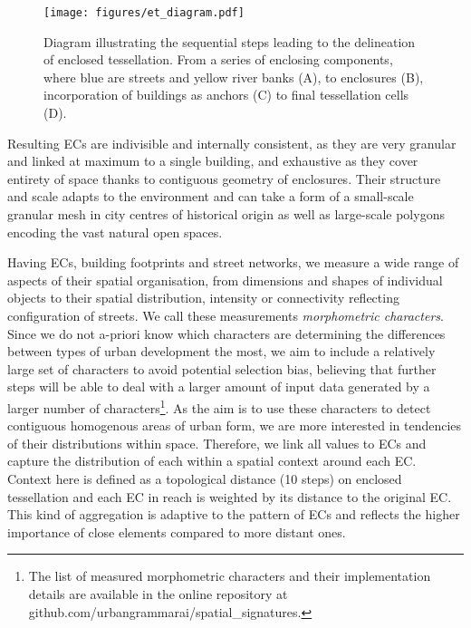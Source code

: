 \begin{figure}
    \texttt{[image: figures/et\_diagram.pdf]}
    \caption{Diagram illustrating the sequential steps leading to the delineation of
    enclosed tessellation. From a series of enclosing components, where blue are streets
    and yellow river banks (A), to enclosures (B), incorporation of buildings as anchors
    (C) to final tessellation cells (D).}
    \label{fig:et_diagram}
\end{figure}

Resulting ECs are indivisible and internally consistent, as they are very granular and
linked at maximum to a single building, and exhaustive as they cover entirety of space
thanks to contiguous geometry of enclosures. Their structure and scale adapts to the
environment and can take a form of a small-scale granular mesh in city centres of
historical origin as well as large-scale polygons encoding the vast natural open spaces.

Having ECs, building footprints and street networks, we measure a wide range of aspects
of their spatial organisation, from dimensions and shapes of individual objects to their
spatial distribution, intensity or connectivity reflecting configuration of streets. We
call these measurements \textit{morphometric characters}. Since we do not a-priori know
which characters are determining the differences between types of urban
development the most, we aim to include a relatively large set of characters to
avoid potential selection bias, believing that further steps will be able to deal with a
larger amount of input data generated by a larger number of characters\footnote{The list
of measured morphometric characters and their implementation details are available in
the online repository at github.com/urbangrammarai/spatial\_signatures.}. As the aim is
to use these characters to detect contiguous homogenous areas of urban form, we are more
interested in tendencies of their distributions within space. Therefore, we link all
values to ECs and capture the distribution of each within a spatial context
around each EC. Context here is defined as a topological distance (10 steps) on enclosed
tessellation and each EC in reach is weighted by its distance to the original EC. This
kind of aggregation is adaptive to the pattern of ECs and reflects the higher importance
of close elements compared to more distant ones.

